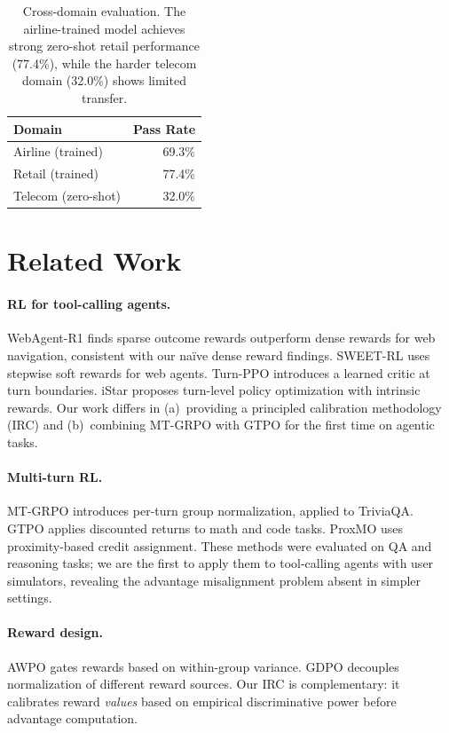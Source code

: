 \documentclass[11pt]{article}
\newcommand{\irc}{\textsc{IRC}}
\begin{document}
\begin{table}[t]
\centering
\small
\begin{tabular}{lr}
\toprule
\textbf{Domain} & \textbf{Pass Rate} \\
\midrule
Airline (trained) & 69.3\% \\
Retail (trained) & 77.4\% \\
Telecom (zero-shot) & 32.0\% \\
\bottomrule
\end{tabular}
\caption{Cross-domain evaluation. The airline-trained model achieves strong zero-shot retail performance (77.4\%), while the harder telecom domain (32.0\%) shows limited transfer.}
\label{tab:cross_domain}
\end{table}

\section{Related Work}
\label{sec:related}

\paragraph{RL for tool-calling agents.} WebAgent-R1 \cite{webagent2025} finds sparse outcome rewards outperform dense rewards for web navigation, consistent with our na\"ive dense reward findings. SWEET-RL \cite{sweetrl2025} uses stepwise soft rewards for web agents. Turn-PPO \cite{turnppo2025} introduces a learned critic at turn boundaries. iStar \cite{istar2025} proposes turn-level policy optimization with intrinsic rewards. Our work differs in (a)~providing a principled calibration methodology (\irc{}) and (b)~combining MT-GRPO with GTPO for the first time on agentic tasks.

\paragraph{Multi-turn RL.} MT-GRPO \cite{zhang2025mt_grpo} introduces per-turn group normalization, applied to TriviaQA. GTPO \cite{gtpo2025} applies discounted returns to math and code tasks. ProxMO \cite{proxmo2025} uses proximity-based credit assignment. These methods were evaluated on QA and reasoning tasks; we are the first to apply them to tool-calling agents with user simulators, revealing the advantage misalignment problem absent in simpler settings.

\paragraph{Reward design.} AWPO \cite{awpo2025} gates rewards based on within-group variance. GDPO \cite{gdpo2025} decouples normalization of different reward sources. Our \irc{} is complementary: it calibrates reward \emph{values} based on empirical discriminative power before advantage computation.
\end{document}
